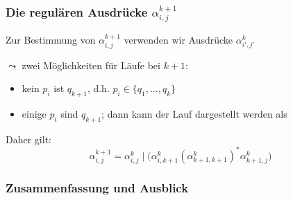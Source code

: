 \documentclass[onlymath]{beamer}
\begin{document}
\begin{frame}\frametitle{Die regulären Ausdrücke $\alpha_{i,j}^{k+1}$}

Zur Bestimmung von $\alpha_{i,j}^{k+1}$ verwenden wir Ausdrücke $\alpha_{i',j'}^{k}$
\bigskip


$\leadsto$ zwei Möglichkeiten für Läufe bei $k+1$:
\begin{itemize}
\item kein $p_i$ ist $q_{k+1}$, d.h. $p_i\in\{q_1,\ldots,q_k\}$
\item einige $p_i$ sind $q_{k+1}$; dann kann der Lauf dargestellt werden als
\end{itemize}
\medskip

Daher gilt: \[\alpha_{i,j}^{k+1} = \alpha_{i,j}^{k} \mid \big( \alpha_{i,k+1}^{k} (\alpha_{k+1,k+1}^{k})^* \alpha_{k+1,j}^{k} \big)\]

\end{frame}

\begin{frame}\frametitle{Zusammenfassung und Ausblick}

% 
% 
% 

\end{frame}
\end{document}
